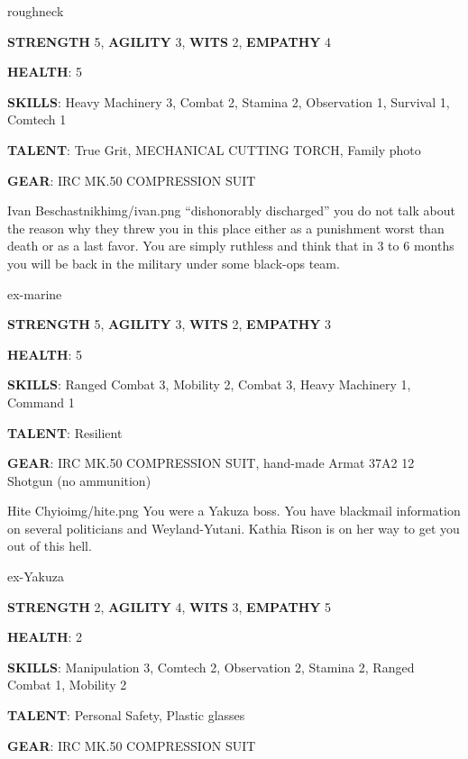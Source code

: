\begin{rpg-commentbox}{}
    roughneck

    \textbf{STRENGTH} 5, \textbf{AGILITY} 3, \textbf{WITS} 2, \textbf{EMPATHY} 4

    \textbf{HEALTH}: 5

    \textbf{SKILLS}: Heavy Machinery 3, Combat 2, Stamina 2, Observation 1, Survival 1, Comtech 1
    
    \textbf{TALENT}: True Grit, MECHANICAL CUTTING TORCH, Family photo
    
    \textbf{GEAR}: IRC MK.50 COMPRESSION SUIT
\end{rpg-commentbox}

\newsect


\begin{rpg-pcbox}{Ivan Beschastnikh}{img/ivan.png}
    ``dishonorably discharged'' you do not talk about the reason why they threw you in this place either as a punishment worst than death or as a last favor. You are simply ruthless and think that in 3 to 6 months you will be back in the military under some black-ops team.
\end{rpg-pcbox}

\begin{rpg-commentbox}{}
    ex-marine

    \textbf{STRENGTH} 5, \textbf{AGILITY} 3, \textbf{WITS} 2, \textbf{EMPATHY} 3

    \textbf{HEALTH}: 5

    \textbf{SKILLS}: Ranged Combat 3, Mobility 2, Combat 3, Heavy Machinery 1, Command 1
    
    \textbf{TALENT}: Resilient
    
    \textbf{GEAR}: IRC MK.50 COMPRESSION SUIT, hand-made Armat 37A2 12 Shotgun (no ammunition)
\end{rpg-commentbox}

\newsect

\begin{rpg-pcbox}{Hite Chyio}{img/hite.png}
    You were a Yakuza boss. You have blackmail information on several politicians and Weyland-Yutani. Kathia Rison is on her way to get you out of this hell. 
\end{rpg-pcbox}

\begin{rpg-commentbox}{}
    ex-Yakuza

    \textbf{STRENGTH} 2, \textbf{AGILITY} 4, \textbf{WITS} 3, \textbf{EMPATHY} 5

    \textbf{HEALTH}: 2

    \textbf{SKILLS}: Manipulation 3, Comtech 2, Observation 2, Stamina 2, Ranged Combat 1, Mobility 2
    
    \textbf{TALENT}: Personal Safety, Plastic glasses
    
    \textbf{GEAR}: IRC MK.50 COMPRESSION SUIT
\end{rpg-commentbox}


